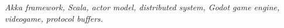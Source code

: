 \textit{
    Akka framework, Scala, actor model, distributed system, Godot game engine, videogame, 
    protocol buffers.
}